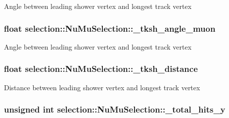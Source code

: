 Angle between leading shower vertex and longest track vertex \hypertarget{classselection_1_1NuMuSelection_a683d563efffdd178b3fa5eaf7e8efeb7}{
\subsubsection[{\-\_\-tksh\-\_\-angle\-\_\-muon}]{\setlength{\rightskip}{0pt plus 5cm}float selection\-::\-Nu\-Mu\-Selection\-::\-\_\-tksh\-\_\-angle\-\_\-muon\hspace{0.3cm}{\ttfamily [private]}}}\label{classselection_1_1NuMuSelection_a683d563efffdd178b3fa5eaf7e8efeb7}
Angle between leading shower vertex and longest track vertex \hypertarget{classselection_1_1NuMuSelection_a046903808fefc33bee41d19b1f6a96de}{
\subsubsection[{\-\_\-tksh\-\_\-distance}]{\setlength{\rightskip}{0pt plus 5cm}float selection\-::\-Nu\-Mu\-Selection\-::\-\_\-tksh\-\_\-distance\hspace{0.3cm}{\ttfamily [private]}}}\label{classselection_1_1NuMuSelection_a046903808fefc33bee41d19b1f6a96de}
Distance between leading shower vertex and longest track vertex \hypertarget{classselection_1_1NuMuSelection_a6c1ae5a457aa2734684c6632abf34a8c}{
\subsubsection[{\-\_\-total\-\_\-hits\-\_\-y}]{\setlength{\rightskip}{0pt plus 5cm}unsigned int selection\-::\-Nu\-Mu\-Selection\-::\-\_\-total\-\_\-hits\-\_\-y\hspace{0.3cm}{\ttfamily [private]}}}\label{classselection_1_1NuMuSelection_a6c1ae5a457aa2734684c6632abf34a8c}

